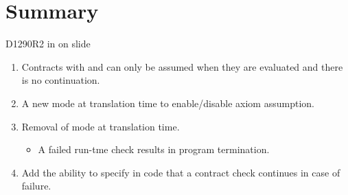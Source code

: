 \section{Summary}

\begin{frame}[t]{D1290R2 in on slide}
\begin{enumerate}
\item Contracts with  and  can only be
	assumed when they are evaluated and there is no continuation.

\vfill
\item A new  mode at translation time to enable/disable axiom assumption.

\vfill
\item Removal of  mode at translation time.
\begin{itemize}
  \item A failed run-tme check results in program termination.
\end{itemize}

\vfill
\item Add the ability to specify in code that a contract check continues in case of failure.
\end{enumerate}
\end{frame}

